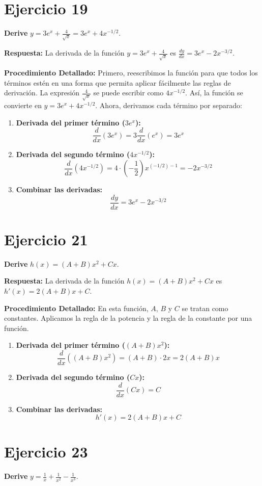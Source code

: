 \documentclass[12pt, a4paper]{article}
\begin{document}
\section{Ejercicio 19}
\textbf{Derive} $y=3e^x+\frac{4}{\sqrt{x}}=3e^x+4x^{-1/2}$.

\textbf{Respuesta:}
La derivada de la función $y=3e^x+\frac{4}{\sqrt{x}}$ es $\frac{dy}{dx}=3e^x-2x^{-3/2}$.

\textbf{Procedimiento Detallado:}
Primero, reescribimos la función para que todos los términos estén en una forma que permita aplicar fácilmente las reglas de derivación. La expresión $\frac{4}{\sqrt{x}}$ se puede escribir como $4x^{-1/2}$.
Así, la función se convierte en $y=3e^x+4x^{-1/2}$.
Ahora, derivamos cada término por separado:
\begin{enumerate}
    \item \textbf{Derivada del primer término ($3e^x$):}
    \[\frac{d}{dx}(3e^x)=3 \frac{d}{dx}(e^x)=3e^x\]
    \item \textbf{Derivada del segundo término ($4x^{-1/2}$):}
    \[\frac{d}{dx}(4x^{-1/2})=4 \cdot \left(-\frac{1}{2}\right)x^{(-1/2)-1} = -2x^{-3/2}\]
    \item \textbf{Combinar las derivadas:}
    \[\frac{dy}{dx}=3e^x-2x^{-3/2}\]
\end{enumerate}

\section{Ejercicio 21}
\textbf{Derive} $h(x)=(A+B)x^2+Cx$.

\textbf{Respuesta:}
La derivada de la función $h(x)=(A+B)x^2+Cx$ es $h'(x)=2(A+B)x+C$.

\textbf{Procedimiento Detallado:}
En esta función, $A$, $B$ y $C$ se tratan como constantes. Aplicamos la regla de la potencia y la regla de la constante por una función.
\begin{enumerate}
    \item \textbf{Derivada del primer término ($(A+B)x^2$):}
    \[\frac{d}{dx}((A+B)x^2)=(A+B) \cdot 2x = 2(A+B)x\]
    \item \textbf{Derivada del segundo término ($Cx$):}
    \[\frac{d}{dx}(Cx)=C\]
    \item \textbf{Combinar las derivadas:}
    \[h'(x)=2(A+B)x+C\]
\end{enumerate}

\section{Ejercicio 23}
\textbf{Derive} $y=\frac{1}{x} + \frac{1}{x^2} - \frac{1}{x^3}$.
\end{document}
